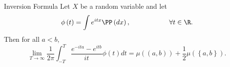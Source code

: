 \documentclass[stat901]{subfiles}
\begin{document}
    \clearpage

    \begin{theorem}{Inversion Formula}
        Let $X$ be a random variable and let
        \begin{equation*}
            \phi\left( t \right) = \int e^{itx}\PP\left( dx \right),\hspace{2cm}\forall t\in\R.
        \end{equation*}
        Then for all $a<b$,
        \begin{equation*}
            \lim_{T\to\infty} \frac{1}{2\pi} \int^T_{-T} \frac{e^{-ita}-e^{itb}}{it}\phi\left( t \right)dt = \mu\left( \left( a,b \right) \right) + \frac{1}{2}\mu\left( \left\lbrace a,b \right\rbrace \right).
        \end{equation*}
    \end{theorem}
\end{document}
